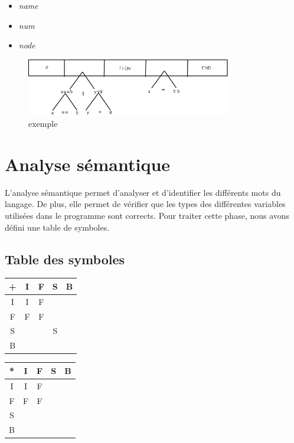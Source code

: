 \documentclass{article}
\begin{document}
\begin{itemize}
\item \emph{name}
\item \emph{num}
\item \emph{node}
\end{itemize}

\begin{figure}[!h]
\centering
\includegraphics[width=0.8\textwidth]{exemple.png}
\caption{exemple}
\end{figure}

\section{Analyse sémantique}
L'analyse sémantique permet d'analyser et d'identifier les différents mots du langage. De plus, elle permet de vérifier que les types des différentes variables utilisées dans le programme sont corrects. Pour traiter cette phase, nous avons défini une table de symboles.
 

\subsection{Table des symboles}

\begin{center}
\begin{tabular}{|c|c|c|c|c|}
  \hline
  + & I & F & S & B \\
  \hline
  I & I & F &   &  \\
  \hline
  F & F & F &   & \\
  \hline
  S &   &   & S & \\
  \hline
  B & & & & \\
  \hline
\end{tabular}
\end{center}


\begin{center}
\begin{tabular}{|c|c|c|c|c|}
  \hline
  * & I & F & S & B \\
  \hline
  I & I & F &   &  \\
  \hline
  F & F & F &   & \\
  \hline
  S &   &   &  & \\
  \hline
  B & & & & \\
\hline
\end{tabular}
\end{center}
\end{document}
